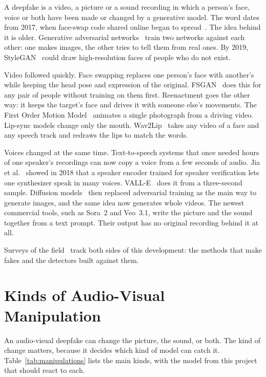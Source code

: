 A deepfake is a video, a picture or a sound recording in which a person's
face, voice or both have been made or changed by a generative model. The word
dates from 2017, when face-swap code shared online began to
spread~\cite{mirsky}. The idea
behind it is older. Generative adversarial networks~\cite{gan} train two
networks against each other: one makes images, the other tries to tell them
from real ones. By 2019, StyleGAN~\cite{stylegan} could draw high-resolution
faces of people who do not exist.

Video followed quickly. Face swapping replaces one person's face with
another's while keeping the head pose and expression of the original.
FSGAN~\cite{fsgan} does this for any pair of people without training on them
first. Reenactment goes the other way: it keeps the target's face and drives
it with someone else's movements. The First Order Motion Model~\cite{fomm}
animates a single photograph from a driving video. Lip-sync models change only
the mouth. Wav2Lip~\cite{wav2lip} takes any video of a face and any speech
track and redraws the lips to match the words.

Voices changed at the same time. Text-to-speech systems that once needed hours
of one speaker's recordings can now copy a voice from a few seconds of audio.
Jia et al.~\cite{sv2tts} showed in 2018 that a speaker encoder trained for
speaker verification lets one synthesizer speak in many voices. VALL-E~\cite{valle}
does it from a three-second sample. Diffusion models~\cite{ddpm,ldm} then
replaced adversarial training as the main way to generate images, and the same
idea now generates whole videos. The newest commercial tools, such as Sora~2
and Veo~3.1, write the picture and the sound together from a text prompt. Their
output has no original recording behind it at all.

Surveys of the field~\cite{tolosana,mirsky} track both sides of this
development: the methods that make fakes and the detectors built against them.

\section{Kinds of Audio-Visual Manipulation}

An audio-visual deepfake can change the picture, the sound, or both. The kind
of change matters, because it decides which kind of model can catch it.
Table~\ref{tab:manipulations} lists the main kinds, with the model from this
project that should react to each.

